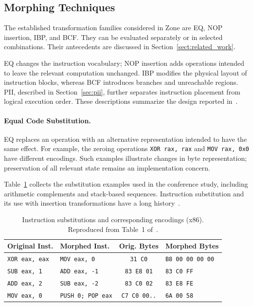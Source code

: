 \documentclass[runningheads]{llncs}
\begin{document}
\subsection{Morphing Techniques}
The established transformation families considered in Zone are EQ, NOP insertion, IBP, and BCF. They can be evaluated separately or in selected combinations. Their antecedents are discussed in Section~\ref{sect:related_work}.

EQ changes the instruction vocabulary; NOP insertion adds operations intended to leave the relevant computation unchanged. IBP modifies the physical layout of instruction blocks, whereas BCF introduces branches and unreachable regions. PII, described in Section~\ref{sec:pii}, further separates instruction placement from logical execution order. These descriptions summarize the design reported in~\cite{zone_secrypt_2026}.

\paragraph{Equal Code Substitution.}
EQ replaces an operation with an alternative representation intended to have the same effect. For example, the zeroing operations \texttt{XOR rax, rax} and \texttt{MOV rax, 0x0} have different encodings. Such examples illustrate changes in byte representation; preservation of all relevant state remains an implementation concern.

Table~\ref{tab:instruction_substitutions_x86} collects the substitution examples used in the conference study, including arithmetic complements and stack-based sequences. Instruction substitution and its use with insertion transformations have a long history~\cite{desai2008towards,desai2010highly,szor2001hunting}.

\begin{table}[t]
    \caption{Instruction substitutions and corresponding encodings (x86). Reproduced from Table~1 of~\cite{zone_secrypt_2026}.}
    \label{tab:instruction_substitutions_x86}
    \small
    \centering
    \setlength{\tabcolsep}{3pt}
    \begin{tabular}{llcl}
        \hline
        \textbf{Original Inst.} & \textbf{Morphed Inst.} & \textbf{Orig. Bytes} & \textbf{Morphed Bytes} \\ \hline
        \texttt{XOR eax, eax} & \texttt{MOV eax, 0} & \texttt{31 C0} & \texttt{B8 00 00 00 00} \\
        \texttt{SUB eax, 1} & \texttt{ADD eax, -1} & \texttt{83 E8 01} & \texttt{83 C0 FF} \\
        \texttt{ADD eax, 2} & \texttt{SUB eax, -2} & \texttt{83 C0 02} & \texttt{83 E8 FE} \\
        \texttt{MOV eax, 0} & \texttt{PUSH 0; POP eax} & \texttt{C7 C0 00..} & \texttt{6A 00 58} \\ \hline
    \end{tabular}
\end{table}
\end{document}
